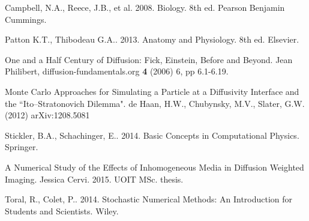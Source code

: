 \documentclass{jthesis}
\begin{document}
\begin{thebibliography}{}

 Campbell, N.A., Reece, J.B., et al. 2008. Biology. 8th ed. Pearson Benjamin Cummings.

 Patton K.T., Thibodeau G.A.. 2013. Anatomy and Physiology. 8th ed. Elsevier.

 One and a Half Century of Diffusion: Fick, Einstein, Before and Beyond. Jean Philibert, diffusion-fundamentals.org \textbf{4} (2006) 6, pp 6.1-6.19.

 Monte Carlo Approaches for Simulating a Particle at a Diffusivity Interface and the ``Ito--Stratonovich Dilemma". de Haan, H.W., Chubynsky, M.V., Slater, G.W. (2012) arXiv:1208.5081

 Stickler, B.A., Schachinger, E.. 2014. Basic Concepts in Computational Physics. Springer.

 A Numerical Study of the Effects of Inhomogeneous Media in Diffusion Weighted Imaging. Jessica Cervi. 2015. UOIT MSc. thesis.

 Toral, R., Colet, P.. 2014. Stochastic Numerical Methods: An Introduction for Students and Scientists. Wiley.

\end{thebibliography}


\end{document}

